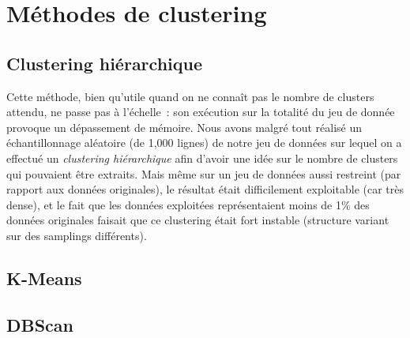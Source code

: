 \section{Méthodes de clustering}

    \subsection{Clustering hiérarchique}
    Cette méthode, bien qu'utile quand on ne connaît pas le nombre de clusters attendu, ne passe pas à l'échelle~: son exécution sur la totalité du jeu de donnée provoque un dépassement de mémoire.
    Nous avons malgré tout réalisé un échantillonnage aléatoire (de 1,000 lignes) de notre jeu de données sur lequel on a effectué un \textit{clustering hiérarchique} afin d'avoir une idée sur le nombre de clusters qui pouvaient être extraits. Mais même sur un jeu de données aussi restreint (par rapport aux données originales), le résultat était difficilement exploitable (car très dense), et le fait que les données exploitées représentaient moins de 1\% des données originales faisait que ce clustering était fort instable (structure variant sur des samplings différents).

    \subsection{K-Means}


    \subsection{DBScan}


